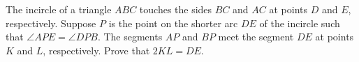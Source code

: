 The incircle of a triangle $ABC$ touches the sides $BC$ and $AC$ at points $D$ and $E$,  respectively. Suppose $P$ is the point on the shorter arc $DE$ of the incircle such that $\angle APE = \angle DPB$. The segments $AP$ and $BP$ meet the segment $DE$ at points $K$ and $L$,  respectively. Prove that $2KL = DE$.
